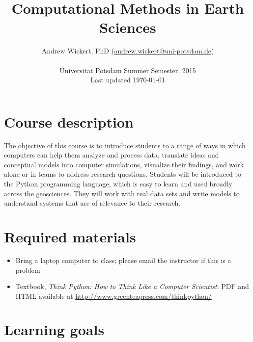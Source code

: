 \documentclass[10pt,a4paper]{amsart}
\title{Computational Methods in Earth Sciences}
\author{Andrew Wickert, PhD (\url{andrew.wickert@uni-potsdam.de})\\
        \\
        Universit\"{a}t Potsdam Summer Semester, 2015\\
        Last updated \today}
\begin{document}
\maketitle

\section{Course description}

The objective of this course is to introduce students to a range of ways in which computers can help them analyze and process data, translate ideas and conceptual models into computer simulations, visualize their findings, and work alone or in teams to address research questions. Students will be introduced to the Python programming language, which is easy to learn and used broadly across the geosciences. They will work with real data sets and write models to understand systems that are of relevance to their research.

\section{Required materials}
\begin{itemize}
 \item Bring a laptop computer to class; please email the instructor if this is a problem
 \item Textbook, \emph{Think Python: How to Think Like a Computer Scientist}: PDF and HTML available at \url{http://www.greenteapress.com/thinkpython/}
\end{itemize}

\section{Learning goals}
\end{document}
